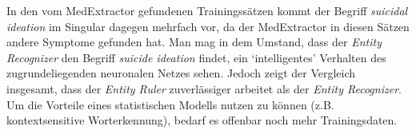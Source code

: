 In den vom MedExtractor gefundenen Trainingssätzen kommt der Begriff \emph{suicidal ideation} im Singular dagegen mehrfach vor, da der MedExtractor in diesen Sätzen andere Symptome gefunden hat. Man mag in dem Umstand, dass der \emph{Entity Recognizer} den Begriff \emph{suicide ideation} findet, ein `intelligentes' Verhalten des zugrundeliegenden neuronalen Netzes sehen. Jedoch zeigt der Vergleich insgesamt, dass der \emph{Entity Ruler} zuverlässiger arbeitet als der \emph{Entity Recognizer}. Um die Vorteile eines statistischen Modells nutzen zu können (z.B. kontextsensitive Worterkennung), bedarf es offenbar noch mehr Trainingsdaten.






